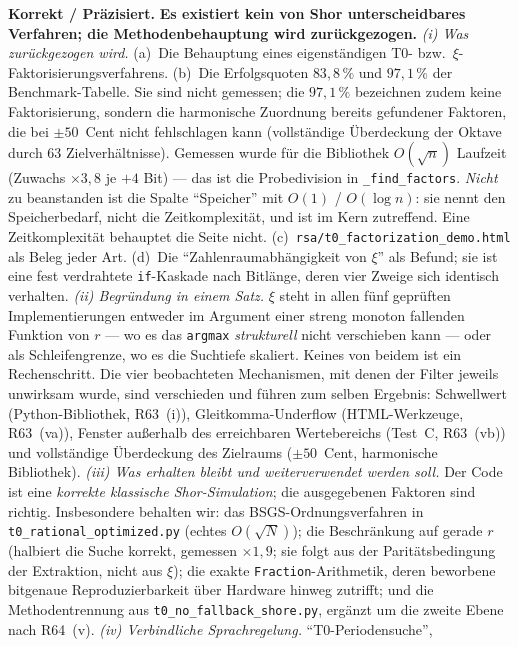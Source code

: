 \smallskip\noindent\textbf{Korrekt / Präzisiert.}\quad
\textbf{Es existiert kein von Shor unterscheidbares Verfahren;
die Methodenbehauptung wird zurückgezogen.}
\emph{(i) Was zurückgezogen wird.} (a)~Die Behauptung eines
eigenständigen T0- bzw.\ $\xi$-Faktorisierungsverfahrens. (b)~Die
Erfolgsquoten $83{,}8\,\%$ und $97{,}1\,\%$ der Benchmark-Tabelle. Sie
sind nicht gemessen; die $97{,}1\,\%$ bezeichnen zudem keine
Faktorisierung, sondern die harmonische Zuordnung bereits gefundener
Faktoren, die bei $\pm 50$~Cent nicht fehlschlagen kann (vollständige
Überdeckung der Oktave durch 63 Zielverhältnisse). Gemessen wurde für
die Bibliothek $O(\sqrt{n})$ Laufzeit (Zuwachs $\times 3{,}8$ je $+4$
Bit) --- das ist die Probedivision in \texttt{\_find\_factors}.
\emph{Nicht} zu beanstanden ist die Spalte \enquote{Speicher} mit
$O(1)$ / $O(\log n)$: sie nennt den Speicherbedarf, nicht die
Zeitkomplexität, und ist im Kern zutreffend. Eine Zeitkomplexität
behauptet die Seite nicht. (c)~\texttt{rsa/t0\_factorization\_demo.html}
als Beleg jeder Art. (d)~Die \enquote{Zahlenraumabhängigkeit von $\xi$}
als Befund; sie ist eine fest verdrahtete \texttt{if}-Kaskade nach
Bitlänge, deren vier Zweige sich identisch verhalten.
\emph{(ii) Begründung in einem Satz.} $\xi$ steht in allen fünf
geprüften Implementierungen entweder im Argument einer streng monoton
fallenden Funktion von $r$ --- wo es das \texttt{argmax}
\emph{strukturell} nicht verschieben kann --- oder als Schleifengrenze,
wo es die Suchtiefe skaliert. Keines von beidem ist ein Rechenschritt.
Die vier beobachteten Mechanismen, mit denen der Filter jeweils
unwirksam wurde, sind verschieden und führen zum selben Ergebnis:
Schwellwert (Python-Bibliothek, R63~(i)), Gleitkomma-Underflow
(HTML-Werkzeuge, R63~(va)), Fenster außerhalb des erreichbaren
Wertebereichs (Test~C, R63~(vb)) und vollständige Überdeckung des
Zielraums ($\pm 50$~Cent, harmonische Bibliothek).
\emph{(iii) Was erhalten bleibt und weiterverwendet werden soll.}
Der Code ist eine \emph{korrekte klassische Shor-Simulation}; die
ausgegebenen Faktoren sind richtig. Insbesondere behalten wir:
das BSGS-Ordnungsverfahren in \texttt{t0\_rational\_optimized.py}
(echtes $O(\sqrt{N})$); die Beschränkung auf gerade $r$ (halbiert die
Suche korrekt, gemessen $\times 1{,}9$; sie folgt aus der
Paritätsbedingung der Extraktion, nicht aus $\xi$); die exakte
\texttt{Fraction}-Arithmetik, deren beworbene bitgenaue
Reproduzierbarkeit über Hardware hinweg zutrifft; und die
Methodentrennung aus \texttt{t0\_no\_fallback\_shore.py}, ergänzt um die
zweite Ebene nach R64~(v).
\emph{(iv) Verbindliche Sprachregelung.} \enquote{T0-Periodensuche},
